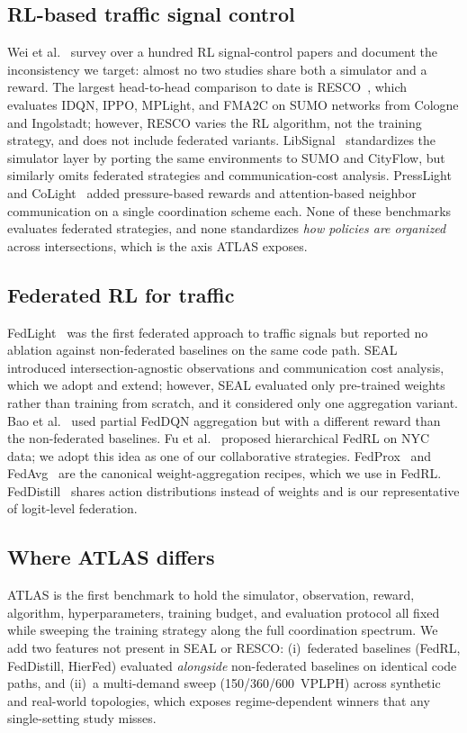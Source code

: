 \documentclass[conference]{IEEEtran}
\begin{document}
\subsection{RL-based traffic signal control}
Wei et al.~\cite{wei2020survey} survey over a hundred RL signal-control papers and document the inconsistency we target: almost no two studies share both a simulator and a reward. The largest head-to-head comparison to date is RESCO~\cite{ault2021resco}, which evaluates IDQN, IPPO, MPLight, and FMA2C on SUMO networks from Cologne and Ingolstadt; however, RESCO varies the RL algorithm, not the training strategy, and does not include federated variants. LibSignal~\cite{mei2024libsignal} standardizes the simulator layer by porting the same environments to SUMO and CityFlow, but similarly omits federated strategies and communication-cost analysis. PressLight~\cite{wei2019presslight} and CoLight~\cite{wei2019colight} added pressure-based rewards and attention-based neighbor communication on a single coordination scheme each. None of these benchmarks evaluates federated strategies, and none standardizes \emph{how policies are organized} across intersections, which is the axis ATLAS exposes.

\subsection{Federated RL for traffic}
FedLight~\cite{ye2021fedlight} was the first federated approach to traffic signals but reported no ablation against non-federated baselines on the same code path. SEAL~\cite{hudson2022seal} introduced intersection-agnostic observations and communication cost analysis, which we adopt and extend; however, SEAL evaluated only pre-trained weights rather than training from scratch, and it considered only one aggregation variant. Bao et al.~\cite{bao2023partial} used partial FedDQN aggregation but with a different reward than the non-federated baselines. Fu et al.~\cite{fu2025hierfed} proposed hierarchical FedRL on NYC data; we adopt this idea as one of our collaborative strategies. FedProx~\cite{li2020fedprox} and FedAvg~\cite{mcmahan2017fedavg} are the canonical weight-aggregation recipes, which we use in FedRL. FedDistill~\cite{jeong2018feddistill} shares action distributions instead of weights and is our representative of logit-level federation.

\subsection{Where ATLAS differs}
ATLAS is the first benchmark to hold the simulator, observation, reward, algorithm, hyperparameters, training budget, and evaluation protocol all fixed while sweeping the training strategy along the full coordination spectrum. We add two features not present in SEAL or RESCO: (i)~federated baselines (FedRL, FedDistill, HierFed) evaluated \emph{alongside} non-federated baselines on identical code paths, and (ii)~a multi-demand sweep (150/360/600~VPLPH) across synthetic and real-world topologies, which exposes regime-dependent winners that any single-setting study misses.
\end{document}
